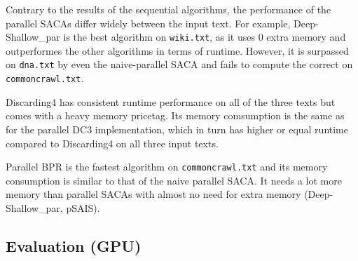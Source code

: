 Contrary to the results of the sequential algorithms, the performance of the parallel SACAs differ widely between the input text.
For example, Deep-Shallow\_par is the best algorithm on \texttt{wiki.txt},
as it uses 0 extra memory and outperformes the other algorithms in terms of runtime.
However, it is surpassed on \texttt{dna.txt} by even the naive-parallel SACA and fails to compute the correct \sa on \texttt{commoncrawl.txt}.

Discarding4 has consistent runtime performance on all of the three texts but comes with a heavy memory pricetag.
Its memory comsumption is the same as for the parallel DC3 implementation,
which in turn has higher or equal runtime compared to Discarding4 on all three input texts.

Parallel BPR is the fastest algorithm on \texttt{commoncrawl.txt} and its memory consumption is similar to that of the naive parallel SACA.
It needs a lot more memory than parallel SACAs with almost no need for extra memory (Deep-Shallow\_par, pSAIS).


\subsection{Evaluation (GPU)}

